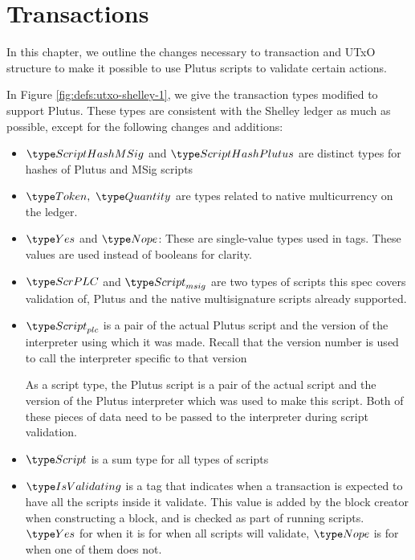 \section{Transactions}
\label{sec:transactions}

In this chapter, we outline the changes necessary to transaction and
UTxO structure to make it possible to use Plutus scripts to validate
certain actions.

In Figure \ref{fig:defs:utxo-shelley-1}, we give the transaction types modified
to support Plutus. These types are consistent with the Shelley ledger
as much as possible,
except for the following changes and additions:

\begin{itemize}
  \item $\ScriptHashMSig$ and $\ScriptHashPlutus$ are distinct types for hashes
  of Plutus and MSig scripts

  \item $\Token,~\Quantity$ are types
  related to native multicurrency on the ledger.

  \item $\Yes$ and $\Nope$: These are single-value types used in tags. These
  values are used instead of booleans for clarity.

  \item $\ScrPLC$ and $\ScriptMSig$ are two types of scripts this spec
  covers validation of, Plutus and the native multisignature scripts already supported.

  \item $\ScriptPlutus$ is a pair of the actual Plutus script and the version of the
  interpreter using which it was made. Recall that the version number is
  used to call the interpreter specific to that version

  As a script type, the Plutus script is a pair of the
  actual script and the version of the Plutus interpreter which was used to
  make this script. Both of these pieces of data need to be passed to the
  interpreter during script validation.

  \item $\Script$ is a sum type for all types of scripts

  \item $\IsValidating$ is a tag that indicates when a transaction is
  expected to have all the scripts inside it validate.
  This value is added by the block creator when
  constructing a block, and is checked as part of running scripts.
  $\Yes$ for when it is for when all scripts will validate,
  $\Nope$ is for when one of them does not.


\end{itemize}
